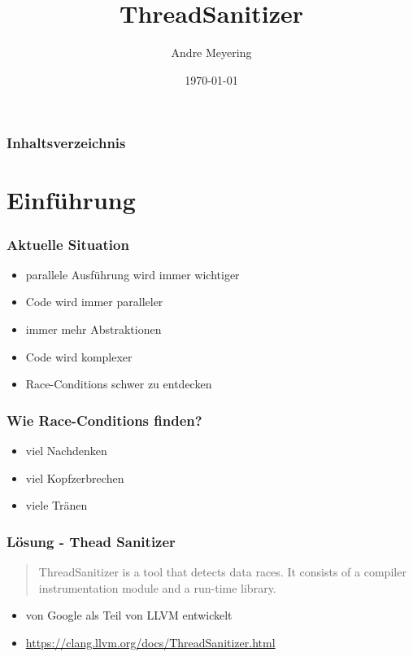 \documentclass[xcolor=dvipsnames,hyperref={pdfpagelabels=false}]{beamer}
\title{ThreadSanitizer}
\author{Andre Meyering}
\date{\today}
\begin{document}
\begin{frame}
\titlepage
\end{frame} 

\begin{frame}
\frametitle{Inhaltsverzeichnis}
\tableofcontents
\end{frame} 


\section{Einführung} 
\begin{frame}
	\frametitle{Aktuelle Situation} 
    \begin{itemize}
    	\item parallele Ausführung wird immer wichtiger
    	\item Code wird immer paralleler\pause 
    	\item immer mehr Abstraktionen
    	\item Code wird komplexer
    	\item Race-Conditions schwer zu entdecken
    \end{itemize}
\end{frame}

\begin{frame} 
	\frametitle{Wie Race-Conditions finden?} 
	\begin{itemize}
		\item viel Nachdenken\pause 
		\item viel Kopfzerbrechen\pause 
		\item viele Tränen
	\end{itemize}
\end{frame}

\begin{frame} 
	\frametitle{Lösung - Thead Sanitizer}
	\begin{quotation}
		ThreadSanitizer is a tool that detects data races. It consists of a compiler instrumentation module and a run-time library.
	\end{quotation}

	\begin{itemize}
		\item von Google als Teil von LLVM entwickelt
		\item \footnotesize{\url{https://clang.llvm.org/docs/ThreadSanitizer.html}}
	\end{itemize}
\end{frame}
\end{document}
